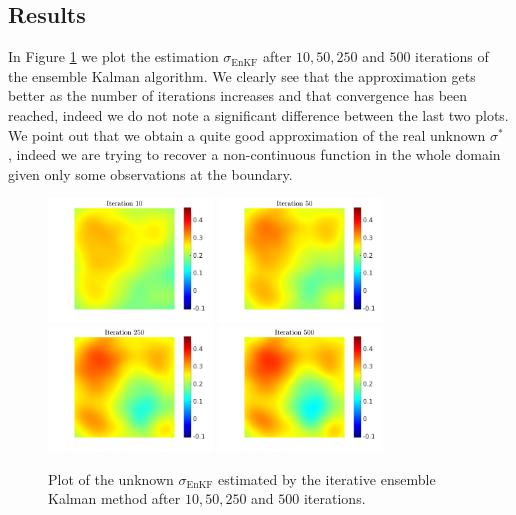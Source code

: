 \documentclass[10pt]{article}
\begin{document}
\subsection{Results}

In Figure \ref{fig:best_solution} we plot the estimation $\sigma_{\mathrm{EnKF}}$ after $10, 50, 250$ and $500$ iterations of the ensemble Kalman algorithm. We clearly see that the approximation gets better as the number of iterations increases and that convergence has been reached, indeed we do not note a significant difference between the last two plots. We point out that we obtain a quite good approximation of the real unknown $\sigma^*$ , indeed we are trying to recover a non-continuous function in the whole domain given only some observations at the boundary.

\begin{figure}[t]
\centering
\includegraphics[width = 0.39\textwidth]{ensemble_10}
\includegraphics[width = 0.39\textwidth]{ensemble_50}
\\
\includegraphics[width = 0.39\textwidth]{ensemble_250}
\includegraphics[width = 0.39\textwidth]{ensemble_500}
\caption{Plot of the unknown $\sigma_{\mathrm{EnKF}}$ estimated by the iterative ensemble Kalman method after $10, 50, 250$ and $500$ iterations.}
\label{fig:best_solution}
\end{figure}
\end{document}

